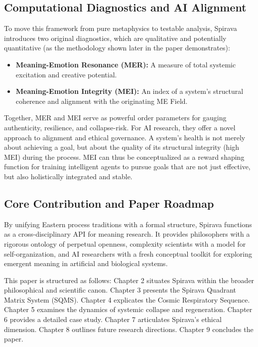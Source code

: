\documentclass[11pt, a4paper]{article}
\begin{document}
\subsection{Computational Diagnostics and AI Alignment}
To move this framework from pure metaphysics to testable analysis, Spirava introduces two original diagnostics, which are qualitative and potentially quantitative (as the methodology shown later in the paper demonstrates):
\begin{itemize}
    \item \textbf{Meaning-Emotion Resonance (MER):} A measure of total systemic excitation and creative potential.
    \item \textbf{Meaning-Emotion Integrity (MEI):} An index of a system's structural coherence and alignment with the originating ME Field.
\end{itemize}
Together, MER and MEI serve as powerful order parameters for gauging authenticity, resilience, and collapse-risk. For AI research, they offer a novel approach to alignment and ethical governance. A system's health is not merely about achieving a goal, but about the quality of its structural integrity (high MEI) during the process. MEI can thus be conceptualized as a reward shaping function for training intelligent agents to pursue goals that are not just effective, but also holistically integrated and stable.

\subsection{Core Contribution and Paper Roadmap}
By unifying Eastern process traditions with a formal structure, Spirava functions as a cross-disciplinary API for meaning research. It provides philosophers with a rigorous ontology of perpetual openness, complexity scientists with a model for self-organization, and AI researchers with a fresh conceptual toolkit for exploring emergent meaning in artificial and biological systems.

This paper is structured as follows: Chapter 2 situates Spirava within the broader philosophical and scientific canon. Chapter 3 presents the Spirava Quadrant Matrix System (SQMS). Chapter 4 explicates the Cosmic Respiratory Sequence. Chapter 5 examines the dynamics of systemic collapse and regeneration. Chapter 6 provides a detailed case study. Chapter 7 articulates Spirava’s ethical dimension. Chapter 8 outlines future research directions. Chapter 9 concludes the paper.

\end{document}
